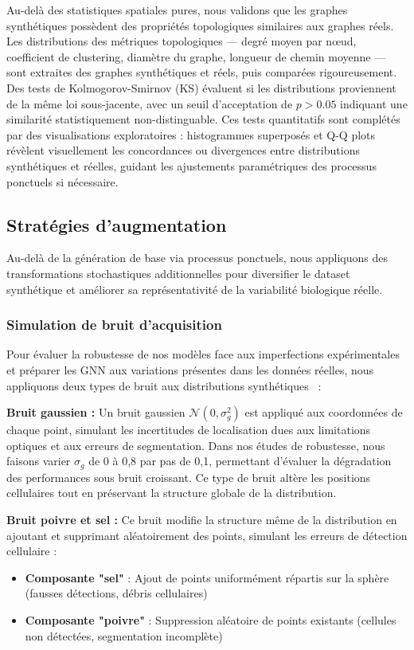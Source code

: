 Au-delà des statistiques spatiales pures, nous validons que les graphes synthétiques possèdent des propriétés topologiques similaires aux graphes réels. Les distributions des métriques topologiques — degré moyen par nœud, coefficient de clustering, diamètre du graphe, longueur de chemin moyenne — sont extraites des graphes synthétiques et réels, puis comparées rigoureusement. Des tests de Kolmogorov-Smirnov (KS) évaluent si les distributions proviennent de la même loi sous-jacente, avec un seuil d'acceptation de $p > 0.05$ indiquant une similarité statistiquement non-distinguable. Ces tests quantitatifs sont complétés par des visualisations exploratoires : histogrammes superposés et Q-Q plots révèlent visuellement les concordances ou divergences entre distributions synthétiques et réelles, guidant les ajustements paramétriques des processus ponctuels si nécessaire.

\subsection{Stratégies d'augmentation}

Au-delà de la génération de base via processus ponctuels, nous appliquons des transformations stochastiques additionnelles pour diversifier le dataset synthétique et améliorer sa représentativité de la variabilité biologique réelle.

\subsubsection{Simulation de bruit d'acquisition}

Pour évaluer la robustesse de nos modèles face aux imperfections expérimentales et préparer les GNN aux variations présentes dans les données réelles, nous appliquons deux types de bruit aux distributions synthétiques~\cite{Martin2025GRETSI2} :

\textbf{Bruit gaussien :}
Un bruit gaussien $\mathcal{N}(0, \sigma_g^2)$ est appliqué aux coordonnées de chaque point, simulant les incertitudes de localisation dues aux limitations optiques et aux erreurs de segmentation. Dans nos études de robustesse, nous faisons varier $\sigma_g$ de 0 à 0,8 par pas de 0,1, permettant d'évaluer la dégradation des performances sous bruit croissant. Ce type de bruit altère les positions cellulaires tout en préservant la structure globale de la distribution.

\textbf{Bruit poivre et sel :}
Ce bruit modifie la structure même de la distribution en ajoutant et supprimant aléatoirement des points, simulant les erreurs de détection cellulaire :
\begin{itemize}
    \item \textbf{Composante "sel"} : Ajout de points uniformément répartis sur la sphère (fausses détections, débris cellulaires)
    \item \textbf{Composante "poivre"} : Suppression aléatoire de points existants (cellules non détectées, segmentation incomplète)
\end{itemize}


